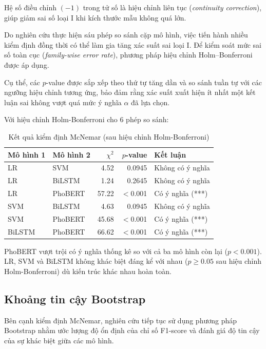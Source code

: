 \documentclass[12pt, a4paper]{report}
\newcommand{\phobert}{PhoBERT\xspace}
\newcommand{\mcnLrSvmChi}{4.52}
\newcommand{\mcnLrSvmP}{0.0945}
\newcommand{\mcnLrBilstmChi}{1.24}
\newcommand{\mcnLrBilstmP}{0.2645}
\newcommand{\mcnLrPhobertChi}{57.22}
\newcommand{\mcnSvmBilstmChi}{4.63}
\newcommand{\mcnSvmBilstmP}{0.0945}
\newcommand{\mcnSvmPhobertChi}{45.68}
\newcommand{\mcnBilstmPhobertChi}{66.62}
\begin{document}
Hệ số điều chỉnh $(-1)$ trong tử số là hiệu chỉnh liên tục 
(\textit{continuity correction}), giúp giảm sai số loại I 
khi kích thước mẫu không quá lớn.

Do nghiên cứu thực hiện sáu phép so sánh cặp mô hình, việc tiến hành nhiều kiểm định 
đồng thời có thể làm gia tăng xác suất sai loại I. 
Để kiểm soát mức sai số toàn cục (\textit{family-wise error rate}), 
phương pháp hiệu chỉnh Holm--Bonferroni được áp dụng.

Cụ thể, các $p$-value được sắp xếp theo thứ tự tăng dần và so sánh tuần tự 
với các ngưỡng hiệu chỉnh tương ứng, bảo đảm rằng xác suất xuất hiện ít nhất 
một kết luận sai không vượt quá mức ý nghĩa $\alpha$ đã lựa chọn.

Với hiệu chỉnh Holm-Bonferroni cho 6 phép so sánh:

\begin{table}[H]
\centering
\caption{Kết quả kiểm định McNemar (sau hiệu chỉnh Holm-Bonferroni)}
\label{tab:mcnemar}
\begin{tabular}{llrrl}
\toprule
\textbf{Mô hình 1} & \textbf{Mô hình 2} & \textbf{$\chi^2$} & \textbf{$p$-value} & \textbf{Kết luận} \\
\midrule
LR      & SVM     & \mcnLrSvmChi  & \mcnLrSvmP    & Không có ý nghĩa \\
LR      & BiLSTM  & \mcnLrBilstmChi  & \mcnLrBilstmP    & Không có ý nghĩa \\
LR      & PhoBERT & \mcnLrPhobertChi & $<$0.001  & Có ý nghĩa (***) \\
SVM     & BiLSTM  & \mcnSvmBilstmChi  & \mcnSvmBilstmP    & Không có ý nghĩa \\
SVM     & PhoBERT & \mcnSvmPhobertChi & $<$0.001  & Có ý nghĩa (***) \\
BiLSTM  & PhoBERT & \mcnBilstmPhobertChi & $<$0.001  & Có ý nghĩa (***) \\
\bottomrule
\end{tabular}
\end{table}

\phobert vượt trội có ý nghĩa thống kê so với cả ba mô hình còn lại ($p < 0.001$). LR, SVM và BiLSTM không khác biệt đáng kể với nhau ($p \geq 0.05$ sau hiệu chỉnh Holm-Bonferroni) dù kiến trúc khác nhau hoàn toàn.

\subsection{Khoảng tin cậy Bootstrap}
Bên cạnh kiểm định McNemar, nghiên cứu tiếp tục sử dụng phương pháp 
Bootstrap nhằm ước lượng độ ổn định của chỉ số F1-score và đánh giá 
độ tin cậy của sự khác biệt giữa các mô hình.
\end{document}
